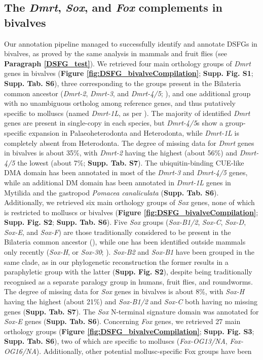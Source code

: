 \documentclass[../main.tex]{subfiles}
\begin{document}
\subsection{The \textit{Dmrt}, \textit{Sox}, and \textit{Fox} complements in bivalves}
Our annotation pipeline managed to successfully identify and annotate DSFGs in bivalves, as proved by the same analysis in mammals and fruit flies (see \textbf{Paragraph \ref{DSFG_test}}).
We retrieved four main orthology groups of \textit{Dmrt} genes in bivalves (\textbf{Figure \ref{fig:DSFG_bivalveCompilation}}; \textbf{Supp. Fig. S1}; \textbf{Supp. Tab. S6}), three corresponding to the groups present in the Bilateria common ancestor (\textit{Dmrt-2}, \textit{Dmrt-3}, and \textit{Dmrt-4/5}; \textbf{\cite{mawaribuchi2019independent}}), and one additional group with no unambiguous ortholog among reference genes, and thus putatively specific to molluscs (named \textit{Dmrt-1L}, as per \textbf{\cite{li2018foxl2,evensen2022comparative}}). The majority of identified \textit{Dmrt} genes are present in single-copy in each species, but \textit{Dmrt-4/5}s show a group-specific expansion in Palaeoheterodonta and Heterodonta, while \textit{Dmrt-1L} is completely absent from Heterodonta. The degree of missing data for \textit{Dmrt} genes in bivalves is about 35\%, with \textit{Dmrt-2} having the highest (about 56\%) and \textit{Dmrt-4/5} the lowest (about 7\%; \textbf{Supp. Tab. S7}). The ubiquitin-binding CUE-like DMA domain has been annotated in most of the \textit{Dmrt-3} and \textit{Dmrt-4/5} genes, while an additional DM domain has been annotated in \textit{Dmrt-1L} genes in Mytilida and the gastropod \textit{Pomacea canaliculata} (\textbf{Supp. Tab. S6}). Additionally, we retrieved six main orthology groups of \textit{Sox} genes, none of which is restricted to molluscs or bivalves (\textbf{Figure \ref{fig:DSFG_bivalveCompilation}}; \textbf{Supp. Fig. S2}; \textbf{Supp. Tab. S6}). Five \textit{Sox} groups (\textit{Sox-B1/2}, \textit{Sox-C}, \textit{Sox-D}, \textit{Sox-E}, and \textit{Sox-F}) are those traditionally considered to be present in the Bilateria common ancestor (\textbf{\cite{phochanukul2010no}}), while one has been identified outside mammals only recently (\textit{Sox-H}, or \textit{Sox-30}; \textbf{\cite{han2010characterization}}). \textit{Sox-B2} and \textit{Sox-B1} have been grouped in the same clade, as in our phylogenetic reconstruction the former results in a paraphyletic group with the latter (\textbf{Supp. Fig. S2}), despite being traditionally recognised as a separate paralogy group in humans, fruit flies, and roundworms. The degree of missing data for \textit{Sox} genes in bivalves is about 8\%, with \textit{Sox-H} having the highest (about 21\%) and \textit{Sox-B1/2} and \textit{Sox-C} both having no missing genes (\textbf{Supp. Tab. S7}). The \textit{Sox} N-terminal signature domain was annotated for \textit{Sox-E} genes (\textbf{Supp. Tab. S6}). Concerning \textit{Fox} genes, we retrieved 27 main orthology groups (\textbf{Figure \ref{fig:DSFG_bivalveCompilation}}; \textbf{Supp. Fig. S3}; \textbf{Supp. Tab. S6}), two of which are specific to molluscs (\textit{Fox-OG13/NA}, \textit{Fox-OG16/NA}). Additionally, other potential mollusc-specific Fox groups have been 
\end{document}
